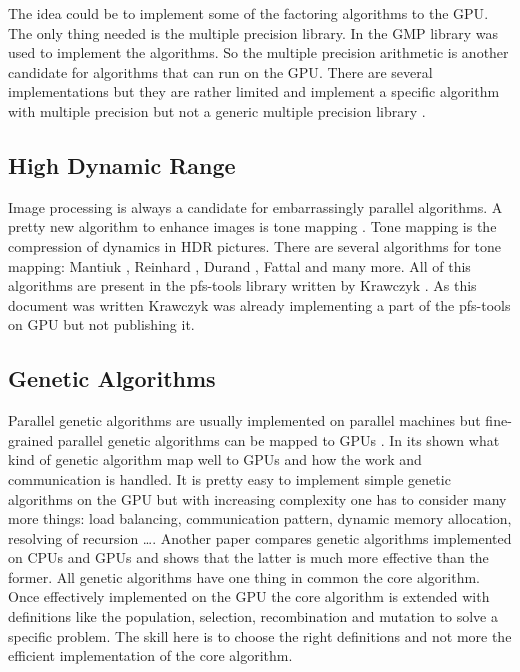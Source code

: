 The idea could be to implement some of the factoring algorithms to the \gls{GPU}.
The only thing needed is the multiple precision library. In \citep{citeulike:3783254} the
\gls{GMP} library was used to implement the algorithms. So
the multiple precision arithmetic is another candidate for algorithms that can
run on the \gls{GPU}. There are several implementations but they are rather limited
and implement a specific algorithm with multiple precision but not a generic multiple
precision library \citep{citeulike:6661955, citeulike:6661957}. 


\subsection{High Dynamic Range} %
\label{par:high_dynamic_range}
Image processing is always a candidate for embarrassingly parallel algorithms. A
pretty new algorithm to enhance images is tone mapping
\citep{citeulike:3783303}. Tone mapping is the compression of dynamics in
\gls{HDR} pictures. There are several algorithms for tone mapping: Mantiuk
\citep{citeulike:3783315}, Reinhard \citep{citeulike:3783311}, Durand
\citep{citeulike:789299}, Fattal \citep{citeulike:3783313} and many more. All of
this algorithms are present in the pfs-tools library written by Krawczyk
\citep{citeulike:3783303}. As this document was written Krawczyk was already
implementing a part of the pfs-tools on \gls{GPU} but not publishing it. 


\subsection{Genetic Algorithms} %
\label{par:genetic_algorithms}
Parallel genetic algorithms are usually implemented on parallel machines but
fine-grained parallel genetic algorithms can be mapped to \glspl{GPU}
\citep{citeulike:3801879}. In \citep{citeulike:3801866} its shown what kind of
genetic algorithm map well to \glspl{GPU} and how the work and communication is
handled. It is pretty easy to implement simple genetic algorithms on the
\gls{GPU} but with increasing complexity one has to consider many more things: load
balancing, communication pattern, dynamic memory allocation, resolving of
recursion \ldots . Another paper \citep{citeulike:3801883} compares genetic
algorithms implemented on \glspl{CPU} and \glspl{GPU} and shows that the latter is much more
effective than the former. All genetic algorithms have one thing in common the
core algorithm. Once effectively implemented on the \gls{GPU} the core algorithm is
extended with definitions like the population, selection, recombination and
mutation to solve a specific problem. The skill here is to choose the right
definitions and not more the efficient implementation of the core algorithm. 

